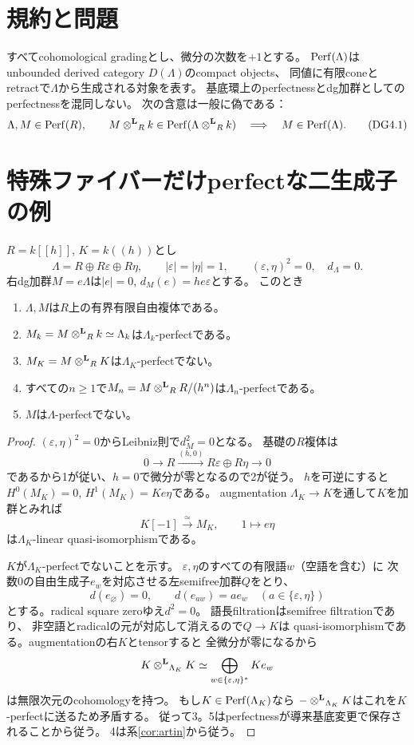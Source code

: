 \section{規約と問題}
すべてcohomological gradingとし、微分の次数を$+1$とする。
$\operatorname{Perf}(\Lambda)$はunbounded derived category $D(\Lambda)$のcompact objects、
同値に有限coneとretractで$\Lambda$から生成される対象を表す。
基底環上のperfectnessとdg加群としてのperfectnessを混同しない。
次の含意は一般に偽である：
\[
\Lambda,M\in\operatorname{Perf}(R),\qquad
M\mathbin{\otimes^{\mathbf L}}_Rk\in\operatorname{Perf}(\Lambda\mathbin{\otimes^{\mathbf L}}_Rk)
\quad\Longrightarrow\quad M\in\operatorname{Perf}(\Lambda).
\tag{DG4.1}
\]

\section{特殊ファイバーだけperfectな二生成子の例}
\begin{theorem}[特殊ファイバーとすべてのArtin切断でperfect]\label{thm:two}
$R=k[[h]]$, $K=k((h))$とし
\[
\Lambda=R\oplus R\varepsilon\oplus R\eta,\qquad
|\varepsilon|=|\eta|=1,\qquad
(\varepsilon,\eta)^2=0,\quad d_\Lambda=0.
\]
右dg加群$M=e\Lambda$は$|e|=0$, $d_M(e)=he\varepsilon$とする。
このとき
\begin{enumerate}
\item $\Lambda,M$は$R$上の有界有限自由複体である。
\item $M_k=M\mathbin{\otimes^{\mathbf L}}_Rk\simeq\Lambda_k$は$\Lambda_k$-perfectである。
\item $M_K=M\mathbin{\otimes^{\mathbf L}}_RK$は$\Lambda_K$-perfectでない。
\item すべての$n\ge1$で$M_n=M\mathbin{\otimes^{\mathbf L}}_RR/(h^n)$は$\Lambda_n$-perfectである。
\item $M$は$\Lambda$-perfectでない。
\end{enumerate}
\end{theorem}
\begin{proof}
$(\varepsilon,\eta)^2=0$からLeibniz則で$d_M^2=0$となる。
基礎の$R$複体は
\[
0\longrightarrow R\xrightarrow{(h,0)}
R\varepsilon\oplus R\eta\longrightarrow0
\]
であるから1が従い、$h=0$で微分が零となるので2が従う。
$h$を可逆にすると$H^0(M_K)=0$, $H^1(M_K)=Ke\eta$である。
augmentation $\Lambda_K\to K$を通して$K$を加群とみれば
\[
K[-1]\xrightarrow{\simeq}M_K,\qquad1\longmapsto e\eta
\]
は$\Lambda_K$-linear quasi-isomorphismである。

$K$が$\Lambda_K$-perfectでないことを示す。
$\varepsilon,\eta$のすべての有限語$w$（空語を含む）に
次数0の自由生成子$e_w$を対応させる左semifree加群$Q$をとり、
\[
d(e_\varnothing)=0,\qquad d(e_{aw})=ae_w
\quad (a\in\{\varepsilon,\eta\})
\]
とする。radical square zeroゆえ$d^2=0$。
語長filtrationはsemifree filtrationであり、
非空語とradicalの元が対応して消えるので$Q\to K$は
quasi-isomorphismである。augmentationの右$K$とtensorすると
全微分が零になるから
\[
K\mathbin{\otimes^{\mathbf L}}_{\Lambda_K}K\simeq
\bigoplus_{w\in\{\varepsilon,\eta\}^{*}}Ke_w
\]
は無限次元のcohomologyを持つ。
もし$K\in\operatorname{Perf}(\Lambda_K)$なら
$-\mathbin{\otimes^{\mathbf L}}_{\Lambda_K}K$はこれを$K$-perfectに送るため矛盾する。
従って3。5はperfectnessが導来基底変更で保存されることから従う。
4は系\ref{cor:artin}から従う。
\end{proof}


